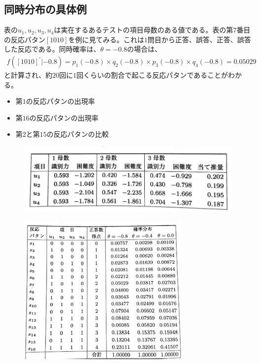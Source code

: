 \documentclass[12pt]{jarticle}
\begin{document}
\subsection{同時分布の具体例}
表の$u_1,u_2,u_3,u_4$は実在するあるテストの項目母数のある値である。表の第$7$番目の反応パタン$[1010]$を例に見てみる。これは$1$問目から正答、誤答、正答、誤答した反応である。同時確率は、$\theta = -0.8$の場合は、
\begin{eqnarray}
  \label{04}
  \displaystyle f([1010]^{\prime}|-0.8) = p_1(-0.8) \times q_2(-0.8) \times p_3(-0.8) \times q_4(-0.8) = 0.05029
\end{eqnarray}
と計算され、約$20$回に$1$回くらいの割合で起こる反応パタンであることがわかる。
\begin{itemize}
  \item 第$1$の反応パタンの出現率
  \item 第$16$の反応パタンの出現率
  \item 第$2$と第$15$の反応パタンの比較
\end{itemize}

\begin{figure}[H]
  \includegraphics[bb = 0 0 1 1,scale = 0.5]{01.jpg}
\end{figure}
\begin{figure}[H]
  \includegraphics[bb = -3 270 1 1,scale = 1.5]{02.jpg}
\end{figure}
\end{document}
